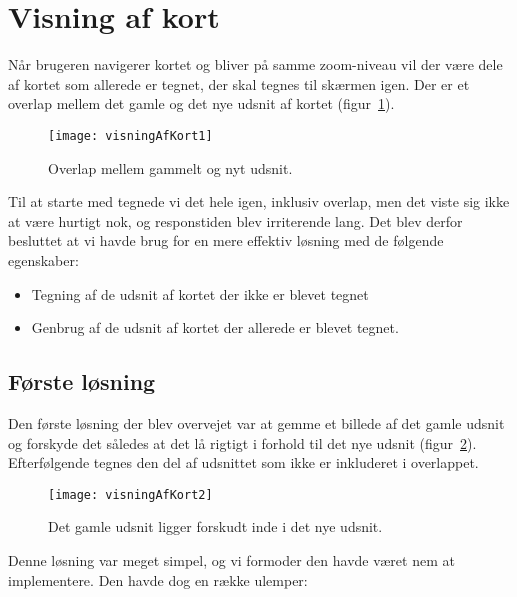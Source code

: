 \section{Visning af kort}
\label{sec:visningAfKort}

Når brugeren navigerer kortet og bliver på samme zoom-niveau vil der være dele af kortet som allerede er tegnet, der skal tegnes til skærmen igen. Der er et overlap mellem det gamle og det nye udsnit af kortet (figur~\ref{figur:visningAfKort1}).

\begin{figure}[h]
	\centering
	\texttt{[image: visningAfKort1]}
	\captionsetup{width=0.8\textwidth}
	\caption{Overlap mellem gammelt og nyt udsnit.}
	\label{figur:visningAfKort1}
\end{figure}

Til at starte med tegnede vi det hele igen, inklusiv overlap, men det viste sig ikke at være hurtigt nok, og responstiden blev irriterende lang. Det blev derfor besluttet at vi havde brug for en mere effektiv løsning med de følgende egenskaber:

\begin{itemize}
	\item Tegning af de udsnit af kortet der ikke er blevet tegnet
	\item Genbrug af de udsnit af kortet der allerede er blevet tegnet.
\end{itemize}

\subsection{Første løsning}
\label{subsec:foersteLoesning}

Den første løsning der blev overvejet var at gemme et billede af det gamle udsnit og forskyde det således at det lå rigtigt i forhold til det nye udsnit (figur~\ref{figur:visningAfKort2}). Efterfølgende tegnes den del af udsnittet som ikke er inkluderet i overlappet.

\begin{figure}[h]
	\centering
	\texttt{[image: visningAfKort2]}
	\captionsetup{width=0.8\textwidth}
	\caption{Det gamle udsnit ligger forskudt inde i det nye udsnit.}
	\label{figur:visningAfKort2}
\end{figure}

Denne løsning var meget simpel, og vi formoder den havde været nem at implementere. Den havde dog en række ulemper:

